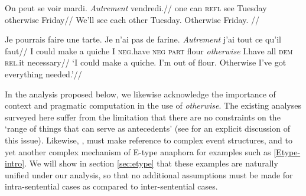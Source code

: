 
\pex\begingl\gla On peut se voir mardi. \emph{Autrement} vendredi.//
\glb one can \textsc{refl} see Tuesday otherwise Friday//
\glft We'll see each other Tuesday. Otherwise Friday. //\endgl\xe
%

\pex\begingl\gla \label{tart}Je pourrais faire une tarte. Je n'ai pas de farine. \emph{Autrement} j'ai tout ce qu'il faut//
\glb I could make a quiche  I  \textsc{neg}.have \textsc{neg} \textsc{part} flour \textit{otherwise} I.have all \textsc{dem} \textsc{rel}.it necessary//
\glft`I could make a quiche. I'm out of flour. Otherwise I've got everything needed.'\footnotemark \hfill \citep[122]{Inkova-Manzotti2002}//\endgl\xe
{}


In the analysis proposed below, we likewise acknowledge the importance of context and pragmatic computation in the use of \textit{otherwise}. The existing analyses surveyed here suffer from the limitation that there are no constraints on the `range of things that can serve as antecedents' (see \citealp{Kruijff-Korbayova2001} for an explicit discussion of this issue). Likewise, \citet{Webber2001}, must make reference to complex event structures, and to yet another complex mechanism of E-type anaphora for examples such as \ref{Etype-intro}. We will show in section \ref{sec:etype} that these examples are naturally unified under our analysis, so that no additional assumptions must be made for intra-sentential cases as compared to inter-sentential cases. 

